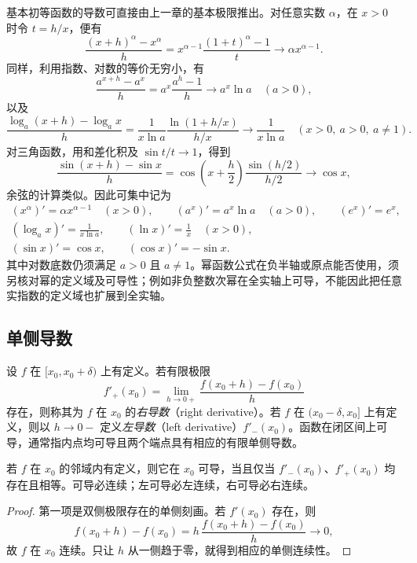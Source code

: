 \documentclass[UTF8,12pt,a4paper,fontset=fandol]{ctexbook}
\begin{document}
基本初等函数的导数可直接由上一章的基本极限推出。对任意实数 $\alpha$，在 $x>0$ 时令 $t=h/x$，便有
\[
    \frac{(x+h)^\alpha-x^\alpha}h
    =x^{\alpha-1}\frac{(1+t)^\alpha-1}t
    \longrightarrow\alpha x^{\alpha-1}.
\]
同样，利用指数、对数的等价无穷小，有
\[
    \frac{a^{x+h}-a^x}h=a^x\frac{a^h-1}h
    \longrightarrow a^x\ln a\quad(a>0),
\]
以及
\[
    \frac{\log_a(x+h)-\log_a x}h
    =\frac1{x\ln a}\frac{\ln(1+h/x)}{h/x}
    \longrightarrow\frac1{x\ln a}
    \quad(x>0,\ a>0,\ a\ne1).
\]
对三角函数，用和差化积及 $\sin t/t\to1$，得到
\[
    \frac{\sin(x+h)-\sin x}h
    =\cos\left(x+\frac h2\right)\frac{\sin(h/2)}{h/2}
    \longrightarrow\cos x,
\]
余弦的计算类似。因此可集中记为
\begin{equation}
\label{eq:basic-power-exponential-trigonometric-derivatives}
\begin{gathered}
    (x^\alpha)'=\alpha x^{\alpha-1}\quad(x>0),\qquad
    (a^x)'=a^x\ln a\quad(a>0),\qquad (e^x)'=e^x,\\
    (\log_a x)'=\frac1{x\ln a},\qquad (\ln x)'=\frac1x\quad(x>0),\\
    (\sin x)'=\cos x,\qquad (\cos x)'=-\sin x.
\end{gathered}
\end{equation}
其中对数底数仍须满足 $a>0$ 且 $a\ne1$。幂函数公式在负半轴或原点能否使用，须另核对幂的定义域及可导性；例如非负整数次幂在全实轴上可导，不能因此把任意实指数的定义域也扩展到全实轴。

\subsection{单侧导数}
\label{subsec:one-sided-derivatives}

\begin{definition}
\label{def:one-sided-derivatives}
设 $f$ 在 $[x_0,x_0+\delta)$ 上有定义。若有限极限
\[
    f'_+(x_0)=\lim_{h\to0+}\frac{f(x_0+h)-f(x_0)}h
\]
存在，则称其为 $f$ 在 $x_0$ 的\emph{右导数}（right derivative）。若 $f$ 在 $(x_0-\delta,x_0]$ 上有定义，则以 $h\to0-$ 定义\emph{左导数}（left derivative）$f'_-(x_0)$。函数在闭区间上可导，通常指内点均可导且两个端点具有相应的有限单侧导数。
\end{definition}

\begin{proposition}
\label{prop:derivative-one-sided-and-continuity}
若 $f$ 在 $x_0$ 的邻域内有定义，则它在 $x_0$ 可导，当且仅当 $f'_-(x_0)$、$f'_+(x_0)$ 均存在且相等。可导必连续；左可导必左连续，右可导必右连续。
\end{proposition}
\begin{proof}
第一项是双侧极限存在的单侧刻画。若 $f'(x_0)$ 存在，则
\[
    f(x_0+h)-f(x_0)
    =h\,\frac{f(x_0+h)-f(x_0)}h\longrightarrow0,
\]
故 $f$ 在 $x_0$ 连续。只让 $h$ 从一侧趋于零，就得到相应的单侧连续性。
\end{proof}
\end{document}
